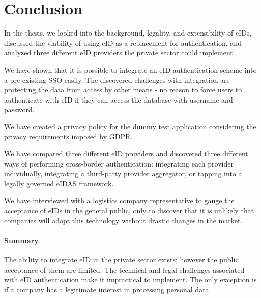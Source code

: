 \section{Conclusion}

In the thesis, we looked into the background, legality, and extensibility of eIDs, discussed the viability of using eID as a replacement for authentication, and analyzed three different eID providers the private sector could implement.

We have shown that it is possible to integrate an eID authentication scheme into a pre-existing SSO easily. The discovered challenges with integration are protecting the data from access by other means - no reason to force users to authenticate with eID if they can access the database with username and password.

We have created a privacy policy for the dummy test application considering the privacy requirements imposed by GDPR.

We have compared three different eID providers and discovered three different ways of performing cross-border authentication: integrating each provider individually, integrating a third-party provider aggregator, or tapping into a legally governed eIDAS framework.

We have interviewed with a logistics company representative to gauge the acceptance of eIDs in the general public, only to discover that it is unlikely that companies will adopt this technology without drastic changes in the market.

\paragraph{Summary} The ability to integrate eID in the private sector exists; however the public acceptance of them are limited. The technical and legal challenges associated with eID authentication make it impractical to implement. The only exception is if a company has a legitimate interest in processing personal data.
